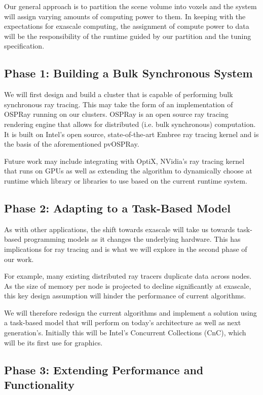 \documentclass[12pt]{article}
\begin{document}
Our general approach is to partition the scene volume into voxels and
the system will assign varying amounts of computing power to them. In
keeping with the expectations for exascale computing, the assignment
of compute power to data will be the responsibility of the runtime
guided by our partition and the tuning specification.

\subsection*{Phase 1: Building a Bulk Synchronous System}

We will first design and build a cluster that is capable of performing
bulk synchronous ray tracing. This may take the form of an
implementation of OSPRay running on our clusters. OSPRay is an open
source ray tracing rendering engine that allows for distributed (i.e.
bulk synchronous) computation. It is built on Intel's open source,
state-of-the-art Embree ray tracing kernel and is the basis of the
aforementioned pvOSPRay.

Future work may include integrating with OptiX, NVidia's ray tracing
kernel that runs on GPUs as well as extending the algorithm to
dynamically choose at runtime which library or libraries to use based
on the current runtime system.

\subsection*{Phase 2: Adapting to a Task-Based Model}

As with other applications, the shift towards exascale will take us
towards task-based programming models as it changes the underlying
hardware. This has implications for ray tracing and is what we will
explore in the second phase of our work.

For example, many existing distributed ray tracers duplicate data
across nodes. As the size of memory per node is projected to decline
significantly at exascale, this key design assumption will hinder the
performance of current algorithms.

We will therefore redesign the current algorithms and implement a
solution using a task-based model that will perform on today's
architecture as well as next generation's. Initially this will be
Intel's Concurrent Collections (CnC), which will be its first use for
graphics.

\subsection*{Phase 3: Extending Performance and Functionality}
\end{document}
